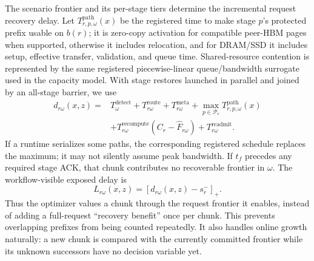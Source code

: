 The scenario frontier and its per-stage tiers determine the incremental
request recovery delay.  Let $T^{\mathrm{path}}_{r,p,\omega}(x)$ be the
registered time to make stage $p$'s protected prefix usable on $b(r)$; it is
zero-copy activation for compatible peer-HBM pages when supported, otherwise
it includes relocation, and for DRAM/SSD it includes setup, effective transfer,
validation, and queue time.  Shared-resource contention is represented by the
same registered piecewise-linear queue/bandwidth surrogate used in the
capacity model.  With stage restores launched in parallel and joined by an
all-stage barrier, we use
\begin{equation}
  \begin{split}
  d_{r\omega}(x,z)={}&T^{\mathrm{detect}}_{\omega}
    +T^{\mathrm{route}}_{r\omega}+T^{\mathrm{meta}}_{r\omega}
    +\max_{p\in\mathcal P_r}T^{\mathrm{path}}_{r,p,\omega}(x)\\
    &+T^{\mathrm{recompute}}_{r\omega}
      (C_r-\widehat F_{r\omega})+T^{\mathrm{readmit}}_{r\omega}.
  \end{split}
  \label{eq:recovery-delay}
\end{equation}
If a runtime serializes some paths, the corresponding registered schedule
replaces the maximum; it may not silently assume peak bandwidth.  If $t_f$
precedes any required stage ACK, that chunk contributes no recoverable frontier
in $\omega$.  The
workflow-visible exposed delay is
\begin{equation}
  L_{r\omega}(x,z)=\left[d_{r\omega}(x,z)-s_r^{-}\right]_+.
  \label{eq:exposed-delay}
\end{equation}
Thus the optimizer values a chunk through the request frontier it enables,
instead of adding a full-request ``recovery benefit'' once per chunk.  This
prevents overlapping prefixes from being counted repeatedly.  It also handles
online growth naturally: a new chunk is compared with the currently committed
frontier while its unknown successors have no decision variable yet.

